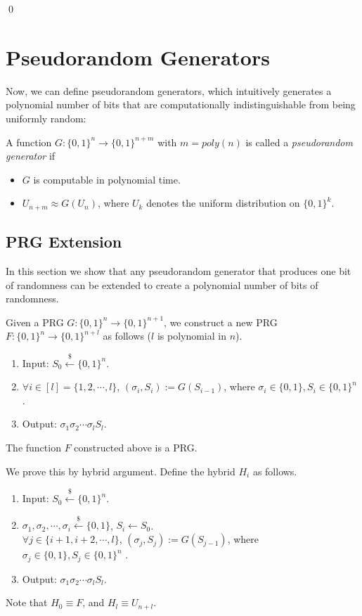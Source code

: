 \documentclass[12pt]{tufte-book}
\begin{document}
\qed


\fi

\section{Pseudorandom Generators}
Now, we can define pseudorandom generators, which intuitively generates a polynomial number of bits that are computationally indistinguishable from being uniformly random:
\begin{definition}
A function $G:\{0,1\}^n\rightarrow \{0,1\}^{n+m}$ with $m = poly(n)$ is called a \emph{pseudorandom generator} if
\begin{itemize}
\item $G$ is computable in polynomial time.
\item $U_{n+m}\approx G(U_n)$, where $U_k$ denotes the uniform distribution on $\{0,1\}^k$.
\end{itemize}
\end{definition}


\subsection{PRG Extension}
In this section we show that any pseudorandom generator that produces one bit of randomness can be extended to create a polynomial number of bits of randomness.

\begin{construction}
Given a PRG $G: \{0, 1\}^n \rightarrow \{0, 1\} ^ {n+1}$,
we construct a new PRG $F: \{0, 1\}^n \rightarrow \{0, 1\} ^{n+l}$ as follows ($l$ is polynomial in $n$).
\begin{enumerate}[label=(\alph*)]
    \item Input: $S_0 \xleftarrow{\$} \{0, 1\}^n$.
    \item $\forall i \in [l] = \{1, 2, \cdots, l\}$, $(\sigma_i, S_i) := G(S_{i-1})$, where $\sigma_i \in \{0, 1\}, S_i \in \{0, 1\}^n$ .
    \item Output: $\sigma_1 \sigma_2 \cdots \sigma_l S_l$.
\end{enumerate}
\end{construction}

\begin{theorem}
The function $F$ constructed above is a PRG.
\end{theorem}

\proof
We prove this by hybrid argument. Define the hybrid $H_i$ as follows.
\begin{enumerate}[label=(\alph*)]
	\item Input: $S_0 \xleftarrow{\$} \{0, 1\}^n$.
    \item $\sigma_1, \sigma_2, \cdots, \sigma_i \xleftarrow{\$} \{0, 1\}$, $S_i \gets S_0$.\\
     $\forall j \in \{i+1, i+2, \cdots, l\}$, $(\sigma_j, S_j) := G(S_{j-1})$, where $\sigma_j \in \{0, 1\}, S_j \in \{0, 1\}^n$ .
    \item Output: $\sigma_1 \sigma_2 \cdots \sigma_l S_l$.
\end{enumerate}
Note that $H_0 \equiv F$, and $H_l \equiv U_{n+l}$.
\end{document}
